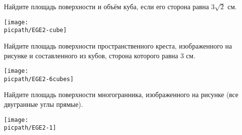 \begin{class}[number=3]
	\begin{listofex}
		\item 
		\begin{minipage}[t]{\bodywidth}
			Найдите площадь поверхности и объём куба, если его сторона равна \(3\sqrt{2}\) см.
		\end{minipage}
		\hspace{0.02\linewidth}
		\begin{minipage}[t]{\picwidth}
			\texttt{[image: \\picpath/EGE2-cube]}
		\end{minipage}
		\item 
		\begin{minipage}[t]{\bodywidth}
			Найдите площадь поверхности пространственного креста, изображенного на рисунке и составленного из кубов, сторона которого равна \(3\) см.
		\end{minipage}
		\hspace{0.02\linewidth}
		\begin{minipage}[t]{\picwidth}
			\texttt{[image: \\picpath/EGE2-6cubes]}
		\end{minipage}
		\item 
		\begin{minipage}[t]{\bodywidth}
			Найдите площадь поверхности многогранника, изображенного на рисунке (все двугранные углы прямые).
		\end{minipage}
		\hspace{0.02\linewidth}
		\begin{minipage}[t]{\picwidth}
			\texttt{[image: \\picpath/EGE2-1]}
		\end{minipage}
		

\end{listofex}
\end{class}
